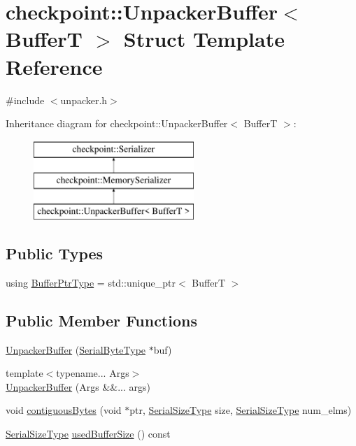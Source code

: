 \hypertarget{structcheckpoint_1_1_unpacker_buffer}{}\section{checkpoint\+:\+:Unpacker\+Buffer$<$ BufferT $>$ Struct Template Reference}
\label{structcheckpoint_1_1_unpacker_buffer}


{\ttfamily \#include $<$unpacker.\+h$>$}

Inheritance diagram for checkpoint\+:\+:Unpacker\+Buffer$<$ BufferT $>$\+:\begin{figure}[H]
\begin{center}
\leavevmode
\includegraphics[height=3.000000cm]{structcheckpoint_1_1_unpacker_buffer}
\end{center}
\end{figure}
\subsection*{Public Types}
\begin{DoxyCompactItemize}
\item 
using \hyperlink{structcheckpoint_1_1_unpacker_buffer_acdd2460fdb60fc584e04cb4069060613}{Buffer\+Ptr\+Type} = std\+::unique\+\_\+ptr$<$ BufferT $>$
\end{DoxyCompactItemize}
\subsection*{Public Member Functions}
\begin{DoxyCompactItemize}
\item 
\hyperlink{structcheckpoint_1_1_unpacker_buffer_a38d2f76f492c5dad5ab59747a6169e18}{Unpacker\+Buffer} (\hyperlink{namespacecheckpoint_ae57f01cdc0b81776c23b6c7c934c58f5}{Serial\+Byte\+Type} $\ast$buf)
\item 
{\footnotesize template$<$typename... Args$>$ }\\\hyperlink{structcheckpoint_1_1_unpacker_buffer_a29ae9066bbc8f43a660d1e0b0163dd44}{Unpacker\+Buffer} (Args \&\&... args)
\item 
void \hyperlink{structcheckpoint_1_1_unpacker_buffer_af771af2cb7b14b35f13a1f4605a73148}{contiguous\+Bytes} (void $\ast$ptr, \hyperlink{namespacecheckpoint_a083f6674da3f94c2901b18c6d238217c}{Serial\+Size\+Type} size, \hyperlink{namespacecheckpoint_a083f6674da3f94c2901b18c6d238217c}{Serial\+Size\+Type} num\+\_\+elms)
\item 
\hyperlink{namespacecheckpoint_a083f6674da3f94c2901b18c6d238217c}{Serial\+Size\+Type} \hyperlink{structcheckpoint_1_1_unpacker_buffer_a2d72e0fc79aaa6e062f17b44b74ed0cc}{used\+Buffer\+Size} () const
\end{DoxyCompactItemize}
